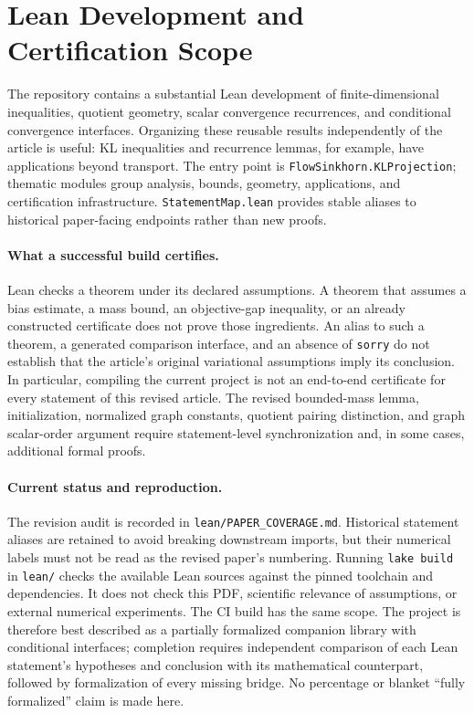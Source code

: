 \section{Lean Development and Certification Scope}\label{app-sec:lean-formalization}
The repository contains a substantial Lean development of finite-dimensional inequalities, quotient geometry, scalar convergence recurrences, and conditional convergence interfaces. Organizing these reusable results independently of the article is useful: KL inequalities and recurrence lemmas, for example, have applications beyond transport. The entry point is \texttt{FlowSinkhorn.KLProjection}; thematic modules group analysis, bounds, geometry, applications, and certification infrastructure. \texttt{StatementMap.lean} provides stable aliases to historical paper-facing endpoints rather than new proofs.

\paragraph{What a successful build certifies.}
Lean checks a theorem under its declared assumptions. A theorem that assumes a bias estimate, a mass bound, an objective-gap inequality, or an already constructed certificate does not prove those ingredients. An alias to such a theorem, a generated comparison interface, and an absence of \texttt{sorry} do not establish that the article's original variational assumptions imply its conclusion. In particular, compiling the current project is not an end-to-end certificate for every statement of this revised article. The revised bounded-mass lemma, initialization, normalized graph constants, quotient pairing distinction, and graph scalar-order argument require statement-level synchronization and, in some cases, additional formal proofs.

\paragraph{Current status and reproduction.}
The revision audit is recorded in \texttt{lean/PAPER\_COVERAGE.md}. Historical statement aliases are retained to avoid breaking downstream imports, but their numerical labels must not be read as the revised paper's numbering. Running \texttt{lake build} in \texttt{lean/} checks the available Lean sources against the pinned toolchain and dependencies. It does not check this PDF, scientific relevance of assumptions, or external numerical experiments. The CI build has the same scope. The project is therefore best described as a partially formalized companion library with conditional interfaces; completion requires independent comparison of each Lean statement's hypotheses and conclusion with its mathematical counterpart, followed by formalization of every missing bridge. No percentage or blanket ``fully formalized'' claim is made here.
